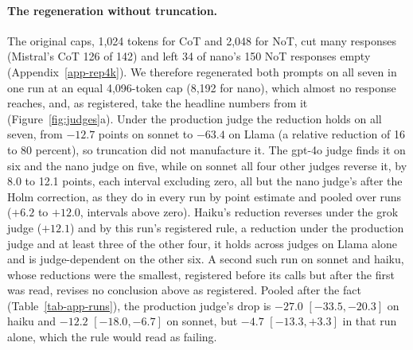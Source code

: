 \paragraph{The regeneration without truncation.}
The original caps, 1,024 tokens for CoT and 2,048 for NoT, cut many
responses (Mistral's CoT 126 of 142) and left 34 of nano's 150 NoT responses
empty (Appendix~\ref{app-rep4k}).
We therefore regenerated both prompts on all seven in one run at an equal
4,096-token cap (8,192 for nano), which almost no response reaches, and, as
registered, take the headline numbers from it (Figure~\ref{fig:judges}a).
Under the production judge the reduction holds on all seven, from $-12.7$
points on sonnet to $-63.4$ on Llama (a relative reduction of 16 to 80
percent), so truncation did not manufacture it. The gpt-4o judge finds it on
six and the nano judge on five, while
on sonnet all four other judges reverse it, by 8.0 to 12.1 points, each
interval excluding zero, all but the nano judge's after the Holm
correction, as they do in every run by point estimate and pooled over runs
($+6.2$ to $+12.0$, intervals above zero).
Haiku's reduction
reverses under the grok judge ($+12.1$) and by this run's
registered rule, a reduction under the production judge and at least three
of the other four, it holds across judges on Llama alone and is
judge-dependent on the other six.
A second such run on sonnet and haiku, whose reductions were the smallest,
registered before its calls but after the first was read, revises no
conclusion above as registered.
Pooled after the fact (Table~\ref{tab-app-runs}), the production judge's
drop is $-27.0$ $[-33.5, -20.3]$ on haiku and $-12.2$
$[-18.0, -6.7]$ on sonnet, but $-4.7$ $[-13.3, +3.3]$ in that run
alone, which the rule would read as failing.

\begin{table}[t]
\caption{\textbf{Content, not form, carries the drop in judged validation,
and each carries most of the drop in accepting the framing.}
Points pooled over the generators haiku, grok, nano and Llama, each prompt minus CoT at the
same 2,048-token cap or the named difference, negative where the first term
is lower, under five validation and two framing judges, $^{\circ}$ marking a 95 percent interval including zero
(Appendix~\ref{app-form}). A cooler tone may partly explain the checklist's
validation drop.}
\label{tab-form-main}
\centering

\end{table}

